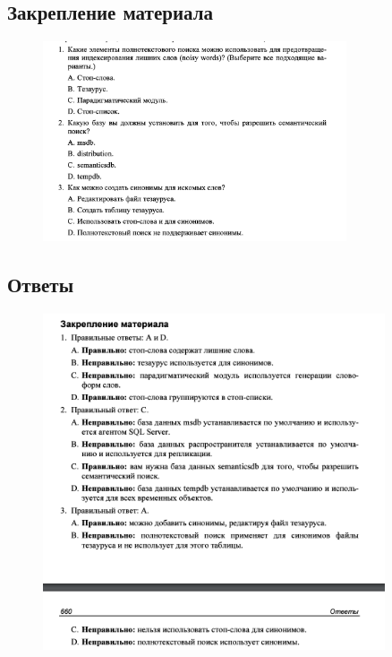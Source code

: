 \subsection*{Закрепление материала}

\begin{figure}[h!]
	\begin{center}
		\includegraphics[width=0.8\textwidth]{img/zakrep14.png}
	\end{center}
	\captionsetup{justification=centering}
\end{figure}

\subsection*{Ответы}

\begin{figure}[h!]
	\begin{center}
		\includegraphics[width=0.9\textwidth]{img/ans15.png}
	\end{center}
	\captionsetup{justification=centering}
\end{figure}
\clearpage


